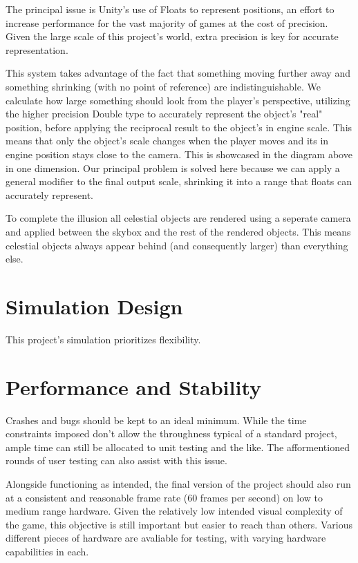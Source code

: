 \documentclass{report}
\begin{document}
The principal issue is Unity's use of Floats to represent positions, an effort to increase performance for the vast majority of games at the cost of precision. Given the large scale of this project's world, extra precision is key for accurate representation. 

This system takes advantage of the fact that something moving further away and something shrinking (with no point of reference) are indistinguishable. We calculate how large something should look from the player's perspective, utilizing the higher precision Double type to accurately represent the object's "real" position, before applying the reciprocal result to the object's in engine scale. This means that only the object's scale changes when the player moves and its in engine position stays close to the camera. This is showcased in the diagram above in one dimension. Our principal problem is solved here because we can apply a general modifier to the final output scale, shrinking it into a range that floats can accurately represent.

 To complete the illusion all celestial objects are rendered using a seperate camera and applied between the skybox and the rest of the rendered objects. This means celestial objects always appear behind (and consequently larger) than everything else.

\section{Simulation Design}

This project's simulation prioritizes flexibility.


\section{Performance and Stability}

Crashes and bugs should be kept to an ideal minimum. While the time constraints imposed don't allow the throughness typical of a standard project, ample time can still be allocated to unit testing and the like. The afformentioned rounds of user testing can also assist with this issue.

Alongside functioning as intended, the final version of the project should also run at a consistent and reasonable frame rate (60 frames per second) on low to medium range hardware. Given the relatively low intended visual complexity of the game, this objective is still important but easier to reach than others. Various different pieces of hardware are avaliable for testing, with varying hardware capabilities in each.
\end{document}
